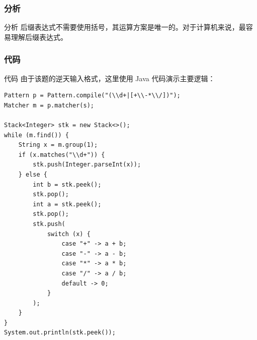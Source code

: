 \documentclass{beamer}
\begin{document}
\subsubsection{分析}
\begin{frame}{分析}
    后缀表达式不需要使用括号，其运算方案是唯一的。对于计算机来说，最容易理解后缀表达式。\\

\end{frame}

\subsubsection{代码}
\begin{frame}[fragile]{代码}
    由于该题的逆天输入格式，这里使用 Java 代码演示主要逻辑：

    \begin{verbatim}
Pattern p = Pattern.compile("(\\d+|[+\\-*\\/])");
Matcher m = p.matcher(s);

Stack<Integer> stk = new Stack<>();
while (m.find()) {
    String x = m.group(1);
    if (x.matches("\\d+")) {
        stk.push(Integer.parseInt(x));
    } else {
        int b = stk.peek();
        stk.pop();
        int a = stk.peek();
        stk.pop();
        stk.push(
            switch (x) {
                case "+" -> a + b;
                case "-" -> a - b;
                case "*" -> a * b;
                case "/" -> a / b;
                default -> 0;
            }
        );
    }
}
System.out.println(stk.peek());
    \end{verbatim}
\end{frame}
\end{document}
